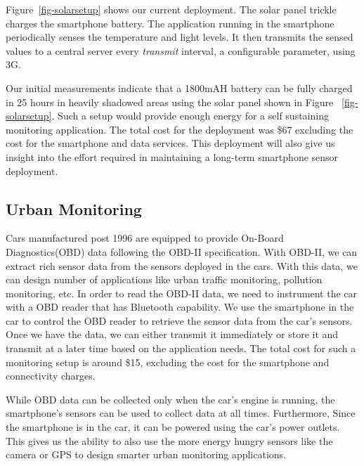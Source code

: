 Figure~\ref{fig-solarsetup} shows our current deployment. The solar panel trickle
charges the smartphone battery. The application running in the smartphone
periodically senses the temperature and light levels. It then transmits the
sensed values to a central server every \textit{transmit} interval, a
configurable parameter, using 3G. 

Our initial measurements indicate that a 1800mAH battery can be fully charged
in 25 hours in heavily shadowed areas using the solar panel shown in Figure
~\ref{fig-solarsetup}. Such a setup would provide
enough energy for a self sustaining monitoring application. The total cost for the
deployment was \$67 excluding the cost for the smartphone and data services.
This deployment will also give us insight into the effort required in
maintaining a long-term smartphone sensor deployment.

\subsection{Urban Monitoring}
Cars manufactured post 1996 are equipped to provide On-Board Diagnostics(OBD)
data following the OBD-II specification. With OBD-II, we can extract rich
sensor data from the sensors deployed in the cars. With this data, we can design number of
applications like urban traffic monitoring, pollution monitoring, etc. In order to 
read the OBD-II data, we need to instrument the car with a OBD reader that has Bluetooth 
capability. We use the smartphone in the car to control
the OBD reader to retrieve the sensor data from the car's sensors. Once we have
the data, we can either transmit it immediately or store it and transmit at a
later time based on the application needs. The total cost for such a monitoring setup
is around \$15, excluding the cost for the smartphone and connectivity charges.

While OBD data can be collected only when the car's engine is running, the
smartphone's sensors can be used to collect data at all times. Furthermore,
Since the smartphone is in the car, it can be powered using the car's power
outlets. This gives us the ability to also use the more energy hungry sensors
like the camera or GPS to design smarter urban monitoring applications. 

